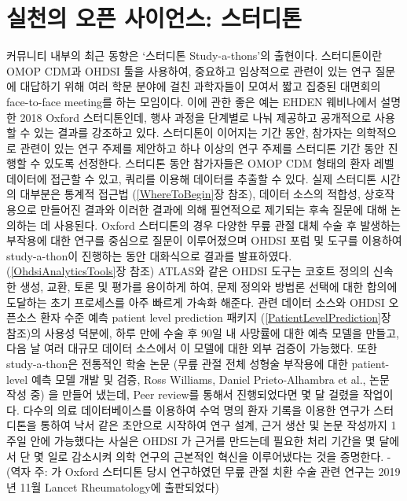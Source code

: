 \documentclass[10.5pt]{book}
\theoremstyle{definition}
\theoremstyle{definition}
\theoremstyle{definition}
\theoremstyle{remark}
\begin{document}
\section{실천의 오픈 사이언스: 스터디톤}\label{---}


커뮤니티 내부의 최근 동향은 `스터디톤 Study-a-thons'의 출현이다.
스터디톤이란 OMOP CDM과 OHDSI 툴을 사용하여, 중요하고 임상적으로 관련이
있는 연구 질문에 대답하기 위해 여러 학문 분야에 걸친 과학자들이 모여서
짧고 집중된 대면회의 face-to-face meeting를 하는 모임이다. 이에 관한
좋은 예는 EHDEN 웨비나에서 설명한 2018 Oxford 스터디톤인데, 행사 과정을
단계별로 나눠 제공하고 공개적으로 사용할 수 있는 결과를 강조하고 있다.
스터디톤이 이어지는 기간 동안, 참가자는 의학적으로 관련이 있는 연구
주제를 제안하고 하나 이상의 연구 주제를 스터디톤 기간 동안 진행할 수
있도록 선정한다. 스터디톤 동안 참가자들은 OMOP CDM 형태의 환자 레벨
데이터에 접근할 수 있고, 쿼리를 이용해 데이터를 추출할 수 있다. 실제
스터디톤 시간의 대부분은 통계적 접근법 (\ref{WhereToBegin}장 참조),
데이터 소스의 적합성, 상호작용으로 만들어진 결과와 이러한 결과에 의해
필연적으로 제기되는 후속 질문에 대해 논의하는 데 사용된다. Oxford
스터디톤의 경우 다양한 무릎 관절 대체 수술 후 발생하는 부작용에 대한
연구를 중심으로 질문이 이루어졌으며 OHDSI 포럼 및 도구를 이용하여
study-a-thon이 진행하는 동안 대화식으로 결과를 발표하였다.
(\ref{OhdsiAnalyticsTools}장 참조) ATLAS와 같은 OHDSI 도구는 코호트
정의의 신속한 생성, 교환, 토론 및 평가를 용이하게 하여, 문제 정의와
방법론 선택에 대한 합의에 도달하는 초기 프로세스를 아주 빠르게 가속화
해준다. 관련 데이터 소스와 OHDSI 오픈소스 환자 수준 예측 patient level
prediction 패키지 (\ref{PatientLevelPrediction}장 참조)의 사용성 덕분에,
하루 만에 수술 후 90일 내 사망률에 대한 예측 모델을 만들고, 다음 날 여러
대규모 데이터 소스에서 이 모델에 대한 외부 검증이 가능했다. 또한
study-a-thon은 전통적인 학술 논문 (무릎 관절 전체 성형술 부작용에 대한
patient-level 예측 모델 개발 및 검증, Ross Williams, Daniel
Prieto-Alhambra et al., 논문 작성 중) 을 만들어 냈는데, Peer review를
통해서 진행되었다면 몇 달 걸렸을 작업이다. 다수의 의료 데이터베이스를
이용하여 수억 명의 환자 기록을 이용한 연구가 스터디톤을 통하여 낙서 같은
초안으로 시작하여 연구 설계, 근거 생산 및 논문 작성까지 1주일 안에
가능했다는 사실은 OHDSI 가 근거를 만드는데 필요한 처리 기간을 몇 달에서
단 몇 일로 감소시켜 의학 연구의 근본적인 혁신을 이루어냈다는 것을
증명한다. - (역자 주: \citet{burn_opioid_2019} 가 Oxford 스터디톤 당시
연구하였던 무릎 관절 치환 수술 관련 연구는 2019년 11월 Lancet
Rheumatology에 출판되었다)
\end{document}
